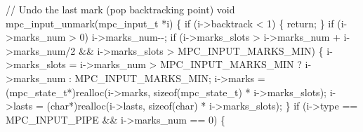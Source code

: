 \documentclass[
  a4paper,
]{scrreprt}
\newenvironment{Shaded}{\begin{snugshade}}{\end{snugshade}}
\newcommand{\CommentTok}[1]{\textcolor[rgb]{0.41,0.41,0.41}{#1}}
\newcommand{\ControlFlowTok}[1]{\textcolor[rgb]{0.85,0.12,0.09}{#1}}
\newcommand{\DataTypeTok}[1]{\textcolor[rgb]{0.47,0.16,0.63}{#1}}
\newcommand{\DecValTok}[1]{\textcolor[rgb]{0.47,0.16,0.63}{#1}}
\newcommand{\KeywordTok}[1]{\textcolor[rgb]{0.85,0.12,0.09}{#1}}
\newcommand{\NormalTok}[1]{\textcolor[rgb]{0.33,0.33,0.33}{#1}}
\newcommand{\OperatorTok}[1]{\textcolor[rgb]{0.00,0.46,0.62}{#1}}
\theoremstyle{definition}
\theoremstyle{remark}
\begin{document}
\begin{Shaded}
\begin{Highlighting}[numbers=left,,]
\CommentTok{// Undo the last mark (pop backtracking point)}
\DataTypeTok{void}\NormalTok{ mpc\_input\_unmark}\OperatorTok{(}\NormalTok{mpc\_input\_t }\OperatorTok{*}\NormalTok{i}\OperatorTok{)} \OperatorTok{\{}
  \ControlFlowTok{if} \OperatorTok{(}\NormalTok{i}\OperatorTok{{-}\textgreater{}}\NormalTok{backtrack }\OperatorTok{\textless{}} \DecValTok{1}\OperatorTok{)} \OperatorTok{\{} \ControlFlowTok{return}\OperatorTok{;} \OperatorTok{\}}
  \ControlFlowTok{if} \OperatorTok{(}\NormalTok{i}\OperatorTok{{-}\textgreater{}}\NormalTok{marks\_num }\OperatorTok{\textgreater{}} \DecValTok{0}\OperatorTok{)}
\NormalTok{    i}\OperatorTok{{-}\textgreater{}}\NormalTok{marks\_num}\OperatorTok{{-}{-};}
  \ControlFlowTok{if} \OperatorTok{(}\NormalTok{i}\OperatorTok{{-}\textgreater{}}\NormalTok{marks\_slots }\OperatorTok{\textgreater{}}\NormalTok{ i}\OperatorTok{{-}\textgreater{}}\NormalTok{marks\_num }\OperatorTok{+}\NormalTok{ i}\OperatorTok{{-}\textgreater{}}\NormalTok{marks\_num}\OperatorTok{/}\DecValTok{2} \OperatorTok{\&\&}\NormalTok{ i}\OperatorTok{{-}\textgreater{}}\NormalTok{marks\_slots }\OperatorTok{\textgreater{}}\NormalTok{ MPC\_INPUT\_MARKS\_MIN}\OperatorTok{)} \OperatorTok{\{}
\NormalTok{    i}\OperatorTok{{-}\textgreater{}}\NormalTok{marks\_slots }\OperatorTok{=}\NormalTok{ i}\OperatorTok{{-}\textgreater{}}\NormalTok{marks\_num }\OperatorTok{\textgreater{}}\NormalTok{ MPC\_INPUT\_MARKS\_MIN }\OperatorTok{?}\NormalTok{ i}\OperatorTok{{-}\textgreater{}}\NormalTok{marks\_num }\OperatorTok{:}\NormalTok{ MPC\_INPUT\_MARKS\_MIN}\OperatorTok{;}
\NormalTok{    i}\OperatorTok{{-}\textgreater{}}\NormalTok{marks }\OperatorTok{=} \OperatorTok{(}\NormalTok{mpc\_state\_t}\OperatorTok{*)}\NormalTok{realloc}\OperatorTok{(}\NormalTok{i}\OperatorTok{{-}\textgreater{}}\NormalTok{marks}\OperatorTok{,} \KeywordTok{sizeof}\OperatorTok{(}\NormalTok{mpc\_state\_t}\OperatorTok{)} \OperatorTok{*}\NormalTok{ i}\OperatorTok{{-}\textgreater{}}\NormalTok{marks\_slots}\OperatorTok{);}
\NormalTok{    i}\OperatorTok{{-}\textgreater{}}\NormalTok{lasts }\OperatorTok{=} \OperatorTok{(}\DataTypeTok{char}\OperatorTok{*)}\NormalTok{realloc}\OperatorTok{(}\NormalTok{i}\OperatorTok{{-}\textgreater{}}\NormalTok{lasts}\OperatorTok{,} \KeywordTok{sizeof}\OperatorTok{(}\DataTypeTok{char}\OperatorTok{)} \OperatorTok{*}\NormalTok{ i}\OperatorTok{{-}\textgreater{}}\NormalTok{marks\_slots}\OperatorTok{);}
  \OperatorTok{\}}
  \ControlFlowTok{if} \OperatorTok{(}\NormalTok{i}\OperatorTok{{-}\textgreater{}}\NormalTok{type }\OperatorTok{==}\NormalTok{ MPC\_INPUT\_PIPE }\OperatorTok{\&\&}\NormalTok{ i}\OperatorTok{{-}\textgreater{}}\NormalTok{marks\_num }\OperatorTok{==} \DecValTok{0}\OperatorTok{)} \OperatorTok{\{}

\end{Highlighting}
\end{Shaded}
\end{document}
